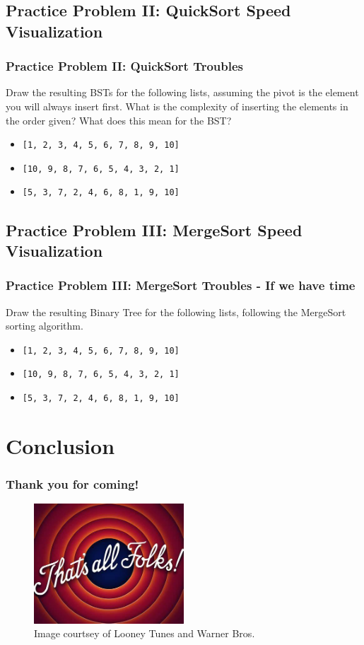 \documentclass[hyperref={colorlinks,citecolor=blue,linkcolor=blue,urlcolor=blue}, aspectratio=1610]{beamer}
\begin{document}
\subsection{Practice Problem II: QuickSort Speed Visualization}
\begin{frame}
  \frametitle{Practice Problem II: QuickSort Troubles}
  Draw the resulting BSTs for the following lists, assuming the pivot is the element you will always insert first. What is the complexity of inserting the elements in the order given? What does this mean for the BST?
  \begin{itemize}
    \item \texttt{[1, 2, 3, 4, 5, 6, 7, 8, 9, 10]}
    \item \texttt{[10, 9, 8, 7, 6, 5, 4, 3, 2, 1]}
    \item \texttt{[5, 3, 7, 2, 4, 6, 8, 1, 9, 10]}
  \end{itemize}
\end{frame}

\subsection{Practice Problem III: MergeSort Speed Visualization}
\begin{frame}
  \frametitle{Practice Problem III: MergeSort Troubles - If we have time}
  Draw the resulting Binary Tree for the following lists, following the MergeSort sorting algorithm.
  \begin{itemize}
    \item \texttt{[1, 2, 3, 4, 5, 6, 7, 8, 9, 10]}
    \item \texttt{[10, 9, 8, 7, 6, 5, 4, 3, 2, 1]}
    \item \texttt{[5, 3, 7, 2, 4, 6, 8, 1, 9, 10]}
  \end{itemize}
\end{frame}

\section{Conclusion}
\begin{frame}
  \frametitle{Thank you for coming!}
  \centering
  \begin{figure}
    \includegraphics[width=0.5\textwidth]{that's_all_folks.jpeg}
    \caption{Image courtsey of Looney Tunes\texttrademark{} and Warner Bros.\texttrademark{}}
  \end{figure}
\end{frame}
\end{document}
